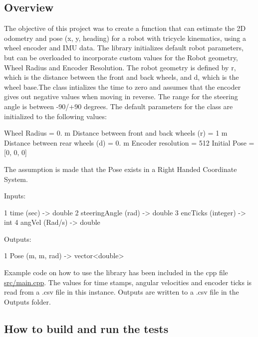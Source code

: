 \subsection*{Overview}

The objective of this project was to create a function that can estimate the 2D odometry and pose (x, y, heading) for a robot with tricycle kinematics, using a wheel encoder and I\+MU data. The library initializes default robot parameters, but can be overloaded to incorporate custom values for the Robot geometry, Wheel Radius and Encoder Resolution. The robot geometry is defined by r, which is the distance between the front and back wheels, and d, which is the wheel base.\+The class intializes the time to zero and assumes that the encoder gives out negative values when moving in reverse. The range for the steering angle is between -\/90/+90 degrees. The default parameters for the class are initialized to the following values\+:

Wheel Radius = 0. m Distance between front and back wheels (r) = 1 m Distance between rear wheels (d) = 0. m Encoder resolution = 512 Initial Pose = \mbox{[}0, 0, 0\mbox{]}

The assumption is made that the Pose exists in a Right Handed Coordinate System.


\begin{DoxyItemize}
\item Inputs\+: 
\begin{DoxyCode}
1 time (sec)          -> double
2 steeringAngle (rad) -> double
3 encTicks (integer)  -> int
4 angVel (Rad/s)      -> double
\end{DoxyCode}

\item Outputs\+: 
\begin{DoxyCode}
1 Pose (m, m, rad)    -> vector<double>
\end{DoxyCode}

\end{DoxyItemize}

Example code on how to use the library has been included in the cpp file \hyperlink{main_8cpp}{src/main.\+cpp}. The values for time stamps, angular velocities and encoder ticks is read from a .csv file in this instance. Outputs are written to a .csv file in the Outputs folder.

\subsection*{How to build and run the tests}


